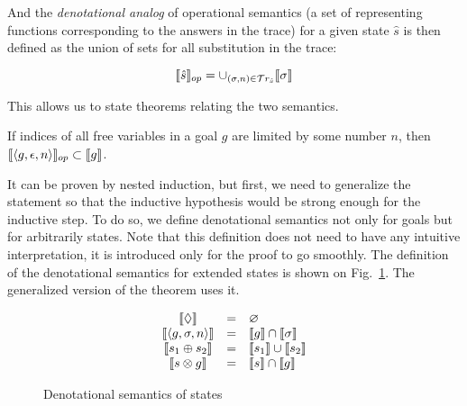 And the \emph{denotational analog} of operational semantics (a set of representing functions corresponding to the answers in the trace) for a given state $\hat{s}$ is
then defined as the union of sets for all substitution in the trace:

\[
\llbracket{\hat{s}}\rrbracket_{op} = \cup_{(\sigma, n) \in \mathcal{T}r_{\hat{s}}} \llbracket{\sigma}\rrbracket
\]

\begin{comment}
In \textsc{Coq} we again use a proposition instead:

\begin{lstlisting}[language=Coq]
   Definition in_denotational_analog
      (t : trace) (f : repr_fun) : Prop :=
      exists s n, in_stream (Answer s n) t /\
             in_denotational_sem_subst s f.
   Notation "{| t , f |}" := (in_denotational_analog t f).
\end{lstlisting}
\end{comment}

This allows us to state theorems relating the two semantics.

\begin{theorem}
\label{lem:soundness}
If indices of all free variables in a goal $g$ are limited by some number $n$, then $\llbracket{\left<{g, \epsilon, n}\right>}\rrbracket_{op} \subset \llbracket{g}\rrbracket$.
\end{theorem}

It can be proven by nested induction, but first, we need to generalize the statement so that the inductive hypothesis would be strong enough for the inductive step.
To do so, we define denotational semantics not only for goals but for arbitrarily states. Note that this definition does not need to have any intuitive
interpretation, it is introduced only for the proof to go smoothly. The definition of the denotational semantics for extended states is shown on Fig.~\ref{denotational_semantics_of_states}.
The generalized version of the theorem uses it.

\begin{figure}[t]
  \[
  \begin{array}{ccl}
    \llbracket{\Diamond}\rrbracket&=&\varnothing\\
    \llbracket{\left<{g, \sigma, n}\right>}\rrbracket&=&\llbracket{g}\rrbracket\cap\llbracket{\sigma}\rrbracket\\
    \llbracket{s_1 \oplus s_2}\rrbracket&=&\llbracket{s_1}\rrbracket\cup\llbracket{s_2}\rrbracket\\
    \llbracket{s \otimes g}\rrbracket&=&\llbracket{s}\rrbracket\cap\llbracket{g}\rrbracket\\
  \end{array}
  \]
  \caption{Denotational semantics of states}
  \label{denotational_semantics_of_states}
\end{figure}

